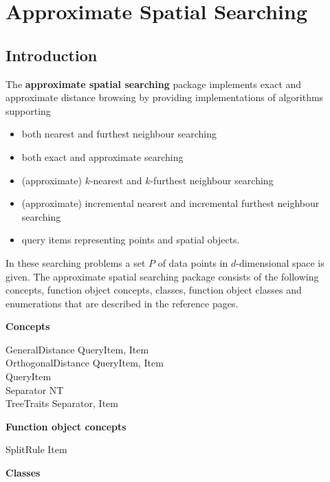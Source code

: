 \chapter{Approximate Spatial Searching}

\section{Introduction}


The {\bf approximate spatial searching} package implements
exact and approximate distance browsing
by providing implementations of algorithms supporting

\begin{itemize} 

\item
both nearest and furthest neighbour searching

\item
both exact and approximate searching

\item 
(approximate) $k$-nearest and $k$-furthest neighbour searching

\item 
(approximate) incremental nearest and incremental furthest neighbour searching

\item
query items representing points and spatial objects.

\end{itemize}

In these searching problems a set $P$ of data points in $d$-dimensional
space is given.
The approximate spatial searching package 
consists of the following concepts, function object concepts, classes, function object classes
and enumerations that are described in the reference pages.

{\bf Concepts}

GeneralDistance \ccOpenAngle QueryItem, Item\ccCloseAngle \\
OrthogonalDistance \ccOpenAngle QueryItem, Item\ccCloseAngle \\
QueryItem \\
Separator \ccOpenAngle NT\ccCloseAngle \\
TreeTraits \ccOpenAngle Separator, Item\ccCloseAngle 

{\bf Function object concepts}

SplitRule \ccOpenAngle Item\ccCloseAngle

{\bf Classes}


